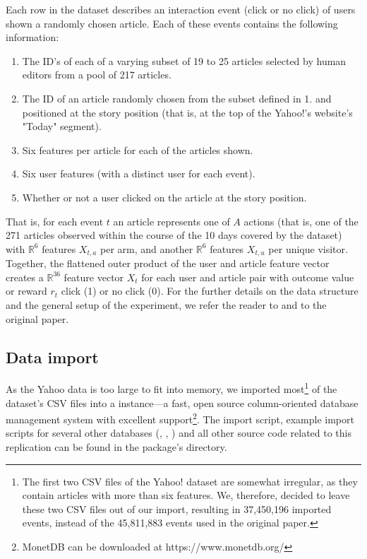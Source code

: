 \documentclass{jss}
\begin{document}
Each row in the dataset describes an interaction event (click or no click) of users shown a randomly chosen article. Each of these events contains the following information:

\begin{enumerate}
         \item The ID's of each of a varying subset of 19 to 25 articles selected by human editors from a pool of 217 articles.
         \item The ID of an article randomly chosen from the subset defined in 1. and positioned at the story position (that is, at the top of the Yahoo!'s website's "Today" segment).
         \item Six features per article for each of the articles shown.
         \item Six user features (with a distinct user for each event).
         \item Whether or not a user clicked on the article at the story position.
\end{enumerate}

That is, for each event $t$ an article represents one of $A$ actions (that is, one of the 271 articles observed within the course of the 10 days covered by the dataset) with $\mathbb{R}^6$ features $X_{t,a}$ per arm, and another $\mathbb{R}^6$ features $X_{t,u}$ per unique visitor. Together, the flattened outer product of the user and article feature vector creates a $\mathbb{R}^{36}$ feature vector $X_t$ for each user and article pair with outcome value or reward $r_t$ click (1) or no click (0). For the further details on the data structure and the general setup of the experiment, we refer the reader to \cite{Chu2009} and to the original \cite{Li2010} paper.

\subsection{Data import} \label{dataimp}

As the Yahoo data is too large to fit into memory, we imported most\footnote{The first two CSV files of the Yahoo! dataset are somewhat irregular, as they contain articles with more than six features. We, therefore, decided to leave these two CSV files out of our import, resulting in 37,450,196 imported events, instead of the 45,811,883 events used in the original paper.} of the dataset's CSV files into a  \citep{IdreosGNMMK12} instance---a fast, open source column-oriented database management system with excellent  support\footnote{MonetDB can be downloaded at https://www.monetdb.org/}. The import script, example import scripts for several other databases (, , ) and all other source code related to this replication can be found in the package's  directory.
\end{document}
